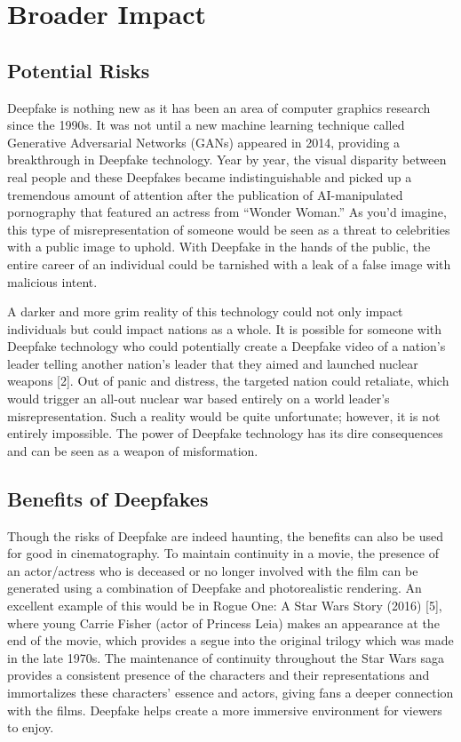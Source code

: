 \documentclass{article}
\begin{document}
\section*{Broader Impact}

\subsection{Potential Risks}
Deepfake is nothing new as it has been an area of computer graphics research since the 1990s. It was not until a new machine learning technique called Generative Adversarial Networks (GANs) appeared in 2014, providing a breakthrough in Deepfake technology. Year by year, the visual disparity between real people and these Deepfakes became indistinguishable and picked up a tremendous amount of attention after the publication of AI-manipulated pornography that featured an actress from “Wonder Woman.” As you’d imagine, this type of misrepresentation of someone would be seen as a threat to celebrities with a public image to uphold. With Deepfake in the hands of the public, the entire career of an individual could be tarnished with a leak of a false image with malicious intent. 

A darker and more grim reality of this technology could not only impact individuals but could impact nations as a whole. It is possible for someone with Deepfake technology who could potentially create a Deepfake video of a nation’s leader telling another nation’s leader that they aimed and launched nuclear weapons [2]. Out of panic and distress, the targeted nation could retaliate, which would trigger an all-out nuclear war based entirely on a world leader’s misrepresentation. Such a reality would be quite unfortunate; however, it is not entirely impossible. The power of Deepfake technology has its dire consequences and can be seen as a weapon of misformation. 

\subsection{Benefits of Deepfakes}
Though the risks of Deepfake are indeed haunting, the benefits can also be used for good in cinematography. To maintain continuity in a movie, the presence of an actor/actress who is deceased or no longer involved with the film can be generated using a combination of Deepfake and photorealistic rendering. An excellent example of this would be in Rogue One: A Star Wars Story (2016) [5], where young Carrie Fisher (actor of Princess Leia) makes an appearance at the end of the movie, which provides a segue into the original trilogy which was made in the late 1970s. The maintenance of continuity throughout the Star Wars saga provides a consistent presence of the characters and their representations and immortalizes these characters’ essence and actors, giving fans a deeper connection with the films. Deepfake helps create a more immersive environment for viewers to enjoy. 
\end{document}
